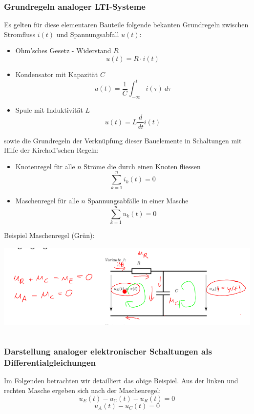 \documentclass[12pt,a4paper]{scrartcl}
\begin{document}
  \subsubsection{Grundregeln analoger LTI-Systeme}
  \label{sec:sub:sub:grundregeln-analoger-lti-systeme}
  \noindent Es gelten für diese elementaren Bauteile folgende bekanten Grundregeln zwischen Stromfluss $i(t)$ und Spannungsabfall $u(t)$:
  \begin{itemize}
    \item Ohm'sches Gesetz - Widerstand $R$ $$ u(t) = R\cdot i(t)$$
    \item Kondensator mit Kapazität $C$ $$u(t) = \frac{1}{C}\int_{-\infty}^{t} i(\tau)\ d\tau$$
    \item Spule mit Induktivität $L$ $$u(t) = L\frac{d}{dt}i(t)$$
  \end{itemize}

  \noindent sowie die Grundregeln der Verknüpfung dieser Bauelemente in Schaltungen mit Hilfe der Kirchoff'schen Regeln:
  \begin{itemize}
    \item Knotenregel für alle $n$ Ströme die durch einen Knoten fliessen $$ \sum_{k=1}^{n}i_k(t) = 0$$ 
    \item Maschenregel für alle $n$ Spannungsabfälle in einer Masche  $$ \sum_{k=1}^{n}u_k(t) = 0$$
  \end{itemize}
  \noindent  Beispiel Maschenregel (Grün):\\
  \includegraphics[height=5cm]{Pictures/PhysikRegeln.png}

  \subsubsection{Darstellung analoger elektronischer Schaltungen als Differentialgleichungen}
  \label{sec:sub:sub:elek-schaltungen-diff}

  Im Folgenden betrachten wir detailliert das obige Beispiel. Aus der linken und rechten Masche ergeben sich nach der Maschenregel:
  $$ u_E(t) - u_C(t)-u_R(t) = 0 $$
  $$ u_A(t)-u_C(t) = 0$$
\end{document}
